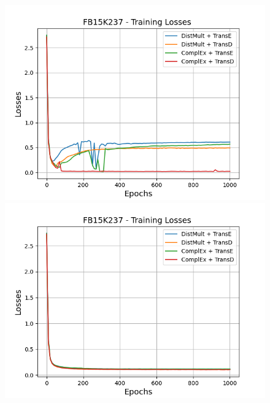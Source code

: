 \begin{figure}[H]
    \centering
    \begin{minipage}{.45\textwidth}
      \centering
      \includegraphics[width=0.9\linewidth]{figures/results/gan_train/not_pretrained/uncertainty/max/entropy/fb15k237/1k_epochs/uncertainty_fb15k237_losses.png}
    \end{minipage}%
    \begin{minipage}{.45\textwidth}
      \centering
      \includegraphics[width=0.9\linewidth]{figures/results/gan_train/not_pretrained/uncertainty/max_distribution/entropy/fb15k237/1k_epochs/uncertainty_fb15k237_losses.png}
    \end{minipage}
    \begin{minipage}{.45\textwidth}
      \centering

\end{minipage}
\end{figure}
